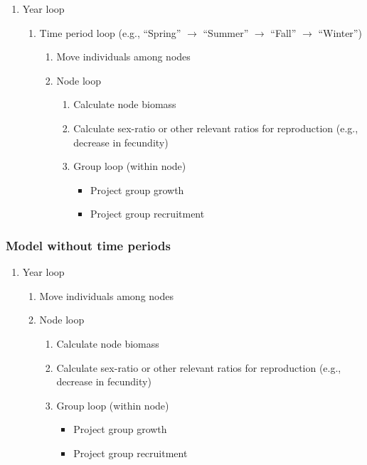 \documentclass{article}[12pt]
\begin{document}
\begin{enumerate}
\item Year loop
	\begin{enumerate}
	\item Time period loop (e.g., ``Spring'' \(\rightarrow\) ``Summer'' \(\rightarrow\) ``Fall'' \(\rightarrow\) ``Winter'')
		\begin{enumerate}
		\item Move individuals among nodes 
		\item Node loop
			\begin{enumerate}
			\item Calculate node biomass
			\item Calculate sex-ratio or other relevant ratios for reproduction (e.g., decrease in fecundity)
			\item Group loop (within node)
				\begin{itemize}
				\item Project group growth
				\item Project group recruitment
				\end{itemize}
			\end{enumerate}
		\end{enumerate}
	\end{enumerate}
\end{enumerate}


\subsubsection{Model without time periods}

\begin{enumerate}
\item Year loop
	\begin{enumerate}
	\item Move individuals among nodes 
	\item Node loop
		\begin{enumerate}
		\item Calculate node biomass	
		\item Calculate sex-ratio or other relevant ratios for reproduction  (e.g., decrease in fecundity)
		\item Group loop (within node)
			\begin{itemize}
			\item Project group growth
			\item Project group recruitment
			\end{itemize}
		\end{enumerate}
	\end{enumerate}
\end{enumerate}
\end{document}

